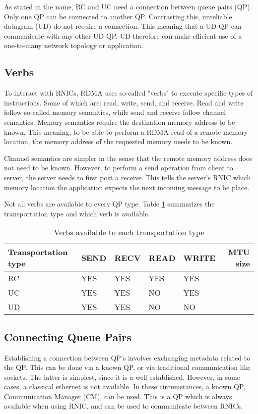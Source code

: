 As stated in the name, RC and UC need a connection between queue pairs (QP).
Only one QP can be connected to another QP.
Contrasting this, unreliable datagram (UD) do not require a connection.
This meaning that a UD QP can communicate with any other UD QP.
UD therefore can make efficient use of a one-to-many network topology or application.

\subsection{Verbs}\label{subsec:verbs}
To interact with RNICs, RDMA uses so-called "verbs" to execute specific types of instructions.
Some of which are: read, write, send, and receive.
Read and write follow so-called memory semantics, while send and receive follow channel semantics.
Memory semantics require the destination memory address to be known.
This meaning, to be able to perform a RDMA read of a remote memory location, the memory address of the requested memory needs to be known.

Channel semantics are simpler in the sense that the remote memory address does not need to be known.
However, to perform a send operation from client to server, the server needs to first post a receive.
This tells the server's RNIC which memory location the application expects the next incoming message to be place.

Not all verbs are available to every QP type. Table \ref{tab:transport-verb} summarizes the transportation type and which verb is available.
\begin{table}
    \centering
    \begin{tabular}{lllllr}
        \toprule
        \textbf{Transportation type} & \textbf{SEND} & \textbf{RECV} & \textbf{READ} & \textbf{WRITE} & \textbf{MTU size} \\
        \midrule
        RC & YES & YES & YES & YES &  \\
        UC & YES & YES & NO & YES &  \\
        UD & YES & YES & NO & NO &  \\
        \bottomrule
    \end{tabular}
    \caption{Verbs available to each transportation type}
    \label{tab:transport-verb}
\end{table}

\subsection{Connecting Queue Pairs}\label{subsec:connecting-qp's}
Establishing a connection between QP's involves exchanging metadata related to the QP.
This can be done via a known QP, or via traditional communication like sockets.
The latter is simplest, since it is a well established.
However, in some cases, a classical ethernet is not available.
In these circumstances, a known QP, Communication Manager (CM), can be used.
This is a QP which is always available when using RNIC, and can be used to communicate between RNICs.

